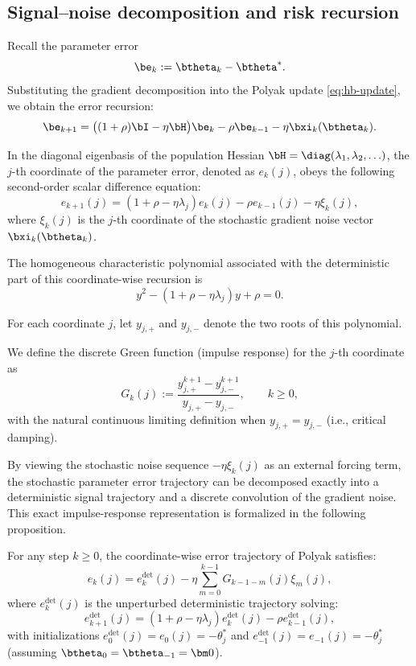 \documentclass[11pt]{article}
\begin{document}
\subsection{Signal--noise decomposition and risk recursion} 
\label{app:pol_signal_noise_decomp}


Recall the parameter error 
\[
\be_k := \btheta_k - \btheta^*.
\]
Substituting the gradient decomposition into the Polyak update \eqref{eq:hb-update}, we obtain the error recursion:
\[
    \be_{k+1} = \bigl((1+\rho)\bI-\eta\bH\bigr)\be_k -\rho\be_{k-1} -\eta\bxi_k(\btheta_k).
\]

In the diagonal eigenbasis of the population Hessian $\bH = \diag(\lambda_1,\lambda_2,\ldots)$, the $j$-th coordinate of the parameter error, denoted as $e_k(j)$, obeys the following second-order scalar difference equation:
\[
    e_{k+1}(j) = (1+\rho-\eta\lambda_j)e_k(j) -\rho e_{k-1}(j) -\eta\xi_k(j),
\]
where $\xi_k(j)$ is the $j$-th coordinate of the stochastic gradient noise vector $\bxi_k(\btheta_k)$.

The homogeneous characteristic polynomial associated with the deterministic part of this coordinate-wise recursion is
\[
    y^2-(1+\rho-\eta\lambda_j)y+\rho=0.
\]

For each coordinate $j$, let $y_{j,+}$ and $y_{j,-}$ denote the two roots of this polynomial. 

We define the discrete Green function (impulse response) for the $j$-th coordinate as
\[
    G_k(j):=\frac{y_{j,+}^{k+1}-y_{j,-}^{k+1}}{y_{j,+}-y_{j,-}},
    \qquad k\ge 0,
\]
with the natural continuous limiting definition when $y_{j,+}=y_{j,-}$ (i.e., critical damping). 

By viewing the stochastic noise sequence $-\eta\xi_k(j)$ as an external forcing term, the stochastic parameter error trajectory can be decomposed exactly into a deterministic signal trajectory and a discrete convolution of the gradient noise. This exact impulse-response representation is formalized in the following proposition.

\begin{proposition}
\label{prop:pol_impulse_response}
For any step $k \ge 0$, the coordinate-wise error trajectory of Polyak satisfies:
\begin{equation} \label{eq:pol_impulse_response}
    e_k(j)
    =
    e_k^{\mathrm{det}}(j)
    -
    \eta\sum_{m=0}^{k-1}G_{k-1-m}(j)\xi_m(j),
\end{equation}
where $e_k^{\mathrm{det}}(j)$ is the unperturbed deterministic trajectory solving:
\[
    e_{k+1}^{\mathrm{det}}(j)
    =
    (1+\rho-\eta\lambda_j)e_k^{\mathrm{det}}(j)
    -
    \rho e_{k-1}^{\mathrm{det}}(j),
\]
with initializations $e_0^{\mathrm{det}}(j) = e_0(j) = -\theta_j^*$ and $e_{-1}^{\mathrm{det}}(j) = e_{-1}(j) = -\theta_j^*$ (assuming $\btheta_0=\btheta_{-1}=\bm0$).
\end{proposition}
\end{document}
